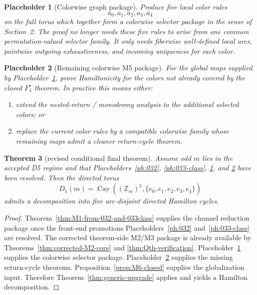 \documentclass[11pt]{article}
\newtheorem{theorem}{Theorem}[section]
\newtheorem{placeholder}[theorem]{Placeholder}
\newcommand{\Z}{\mathbb Z}
\begin{document}
\begin{placeholder}[Colorwise graph package]
\label{ph:colorwise-graph}
Produce five local color rules
\[
a_0,a_1,a_2,a_3,a_4
\]
on the full torus which together form a colorwise selector package in the sense
of Section~2.
The proof no longer needs these five rules to arise from one common
permutation-valued selector family.
It only needs fiberwise well-defined local arcs, pointwise outgoing
exhaustiveness, and incoming uniqueness for each color.
\end{placeholder}

\begin{placeholder}[Remaining colorwise M5 package]
\label{ph:remaining-M5}
For the global maps supplied by Placeholder~\ref{ph:colorwise-graph}, prove
Hamiltonicity for the colors not already covered by the closed
$F_4^{\star}$ theorem. In practice this means either:
\begin{enumerate}[label=\textup{(\alph*)},leftmargin=2.5em]
\item extend the nested-return / monodromy analysis to the additional selected
      colors; or
\item replace the current color rules by a compatible colorwise family whose
      remaining maps admit a cleaner return-cycle theorem.
\end{enumerate}
\end{placeholder}

\begin{theorem}[revised conditional final theorem]
\label{thm:revised-conditional-final}
Assume odd $m$ lies in the accepted D5 regime and that
Placeholders~\ref{ph:032}, \ref{ph:033-class}, \ref{ph:colorwise-graph},
and \ref{ph:remaining-M5} have been resolved.
Then the directed torus
\[
D_5(m)=\operatorname{Cay}((\Z_m)^5,\{e_0,e_1,e_2,e_3,e_4\})
\]
admits a decomposition into five arc-disjoint directed Hamilton cycles.
\end{theorem}

\begin{proof}
Theorem~\ref{thm:M1-from-032-and-033class} supplies the channel reduction
package once the front-end promotions
Placeholders~\ref{ph:032} and~\ref{ph:033-class} are resolved.
The corrected theorem-side M2/M3 package is already available by
Theorems~\ref{thm:corrected-M2-core} and \ref{thm:Qth-verification}.
Placeholder~\ref{ph:colorwise-graph} supplies the colorwise selector package.
Placeholder~\ref{ph:remaining-M5} supplies the missing return-cycle theorems.
Proposition~\ref{prop:M6-closed} supplies the globalization input.
Therefore Theorem~\ref{thm:generic-upgrade} applies and yields a Hamilton
decomposition.
\end{proof}
\end{document}
